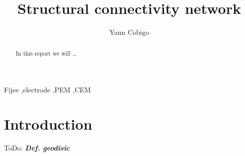 \documentclass[final, paper=letter,5p,times,twocolumn]{elsarticle}
\newcommand{\ToDo}[1]{ToDo: \textbf{\textit{#1}}}
\begin{document}
\begin{frontmatter}

\title{Structural connectivity network}

\author[label1]{Yann Cobigo}
\address[label1]{University of California, San Francisco | ucsf.edu}




\begin{abstract}
In this report we will \dots
\end{abstract}

\begin{keyword}
Fijee \sep electrode \sep PEM \sep CEM
\end{keyword}

\end{frontmatter}


\section{Introduction}

\ToDo{Def. geodisic} \\

\end{document}
